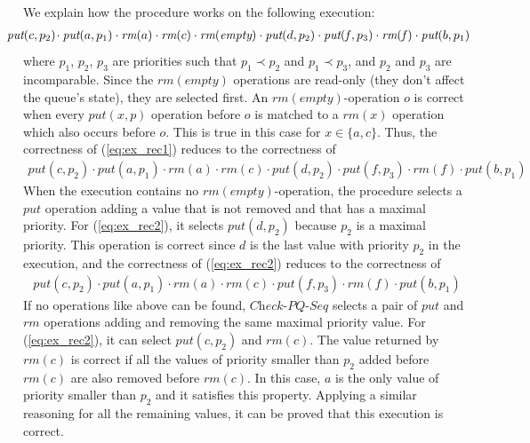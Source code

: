 \documentclass[a4paper,UKenglish]{lipics-v2016}
\begin{document}
We explain how the procedure works on the following execution:
\begin{align}
\hspace{-5mm}\textit{put}(c,p_2)\hspace{-.5mm} \cdot \textit{put}(a,p_1) \cdot \textit{rm}(a) \cdot \textit{rm}(c) \cdot \textit{rm}(\textit{empty}) \cdot \textit{put}(d,p_2) \cdot \textit{put}(\mathit{f},p_3) \cdot \textit{rm}(\mathit{f}) \cdot \textit{put}(b,p_1)\label{eq:ex_rec1}
\end{align}
where $p_1$, $p_2$, $p_3$ are priorities such that $p_1 \prec p_2$ and $p_1 \prec p_3$, and $p_2$ and $p_3$ are incomparable. Since the $\textit{rm}(\textit{empty})$ operations 
are read-only (they don't affect the queue's state), they are selected first. An $\textit{rm}(\textit{empty})$-operation $o$ is correct when every $\textit{put}(x,p)$ operation before $o$ is matched to a $\textit{rm}(x)$ operation which also occurs before $o$. This is true in this case for $x\in \{a,c\}$. Thus, the correctness of (\ref{eq:ex_rec1}) reduces to the correctness of
\begin{align}
\textit{put}(c,p_2) \cdot \textit{put}(a,p_1) \cdot \textit{rm}(a) \cdot \textit{rm}(c) \cdot \textit{put}(d,p_2) \cdot \textit{put}(f,p_3) \cdot \textit{rm}(f) \cdot \textit{put}(b,p_1)\label{eq:ex_rec2}
\end{align}
When the execution contains no $\textit{rm}(\textit{empty})$-operation, the procedure selects a $\textit{put}$ operation adding a value that is not removed and that has a maximal priority. For (\ref{eq:ex_rec2}), it selects $\textit{put}(d,p_2)$ because $p_2$ is a maximal priority. This operation is correct since $d$ is the last value with priority $p_2$ in the execution, and the correctness of (\ref{eq:ex_rec2}) reduces to the correctness of
\begin{align}
\textit{put}(c,p_2) \cdot \textit{put}(a,p_1) \cdot \textit{rm}(a) \cdot \textit{rm}(c) \cdot \textit{put}(f,p_3) \cdot \textit{rm}(f) \cdot \textit{put}(b,p_1)\label{eq:ex_rec3}
\end{align}
If no operations like above can be found, $\textit{Check-PQ-Seq}$ selects a pair of $\textit{put}$ and $\textit{rm}$ operations adding and removing the same maximal priority value. For (\ref{eq:ex_rec2}), it can select 
$\textit{put}(c,p_2)$ and $\textit{rm}(c)$. The value returned by $\textit{rm}(c)$ is correct if all the values of priority smaller than $p_2$ added before $\textit{rm}(c)$ are also removed before $\textit{rm}(c)$. In this case, $a$ is the only value of priority smaller than $p_2$ and it satisfies this property. Applying a similar reasoning for all the remaining values, it can be proved that this execution is correct.
\end{document}
